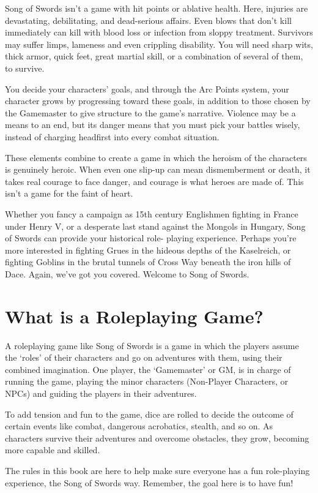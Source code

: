 \documentclass[oneside,11pt,english]{book}
\begin{document}
Song of Swords isn't a game with hit points or ablative health. Here, injuries are devastating, debilitating, 
and dead-serious affairs. Even blows that don't kill immediately can kill with blood loss or infection from 
sloppy treatment. Survivors may suffer limps, lameness and even crippling disability. You will need sharp 
wits, thick armor, quick feet, great martial skill, or a combination of several of them, to survive. 

You decide your characters' goals, and through the Arc Points system, your character grows by 
progressing toward these goals, in addition to those chosen by the Gamemaster to give structure to the 
game's narrative. Violence may be a means to an end, but its danger means that you must pick your 
battles wisely, instead of charging headfirst into every combat situation. 

These elements combine to create a game in which the heroism of the characters is genuinely heroic. 
When even one slip-up can mean dismemberment or death, it takes real courage to face danger, and 
courage is what heroes are made of. This isn't a game for the faint of heart. 

Whether you fancy a campaign as 15th century Englishmen fighting in France under Henry V, or a 
desperate last stand against the Mongols in Hungary, Song of Swords can provide your historical role-
playing experience. Perhaps you’re more interested in fighting Grues in the hideous depths of the 
Kaselreich, or fighting Goblins in the brutal tunnels of Cross Way beneath the iron hills of Dace. Again, 
we’ve got you covered.
Welcome to Song of Swords.

\section{What is a Roleplaying Game?}
A roleplaying game like Song of Swords is a game in which the players assume the ‘roles’ of their 
characters and go on adventures with them, using their combined imagination. One player, the 
‘Gamemaster’ or GM, is in charge of running the game, playing the minor characters (Non-Player 
Characters, or NPCs) and guiding the players in their adventures.

To add tension and fun to the game, dice are rolled to decide the outcome of certain events like combat, 
dangerous acrobatics, stealth, and so on. As characters survive their adventures and overcome obstacles, 
they grow, becoming more capable and skilled. 

The rules in this book are here to help make sure everyone has a fun role-playing experience, the Song of Swords way. Remember, the goal here is to have fun! 
\end{document}
